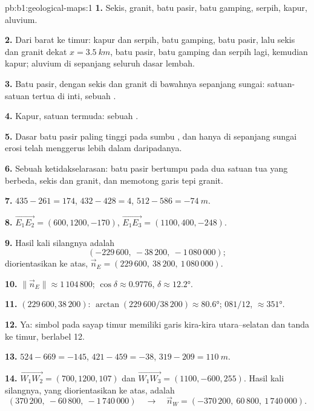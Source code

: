 \begin{solution}{pb:b1:geological-maps:1}
\textbf{1.} Sekis, granit, batu pasir, batu gamping, serpih, kapur, aluvium.

\textbf{2.} Dari barat ke timur: kapur dan serpih, batu gamping, batu pasir, lalu
sekis dan granit dekat $x = \qty{3.5}{km}$, batu pasir, batu gamping dan serpih
lagi, kemudian kapur; aluvium di sepanjang seluruh dasar lembah.

\textbf{3.} Batu pasir, dengan sekis dan granit di bawahnya sepanjang sungai: satuan-satuan tertua di inti, sebuah .

\textbf{4.} Kapur, satuan termuda: sebuah .

\textbf{5.} Dasar batu pasir paling tinggi pada sumbu , dan hanya di sepanjang sungai erosi telah menggerus lebih dalam daripadanya.

\textbf{6.} Sebuah ketidakselarasan: batu pasir bertumpu pada dua satuan tua yang berbeda, sekis dan granit, dan memotong garis tepi granit.

\textbf{7.} $435 - 261 = 174$, $432 - 428 = 4$, $512 - 586 = \qty{-74}{m}$.

\textbf{8.} $\overrightarrow{E_1E_2} = (600, 1200, -170)$,
$\overrightarrow{E_1E_3} = (1100, 400, -248)$.

\textbf{9.} Hasil kali silangnya adalah
\[
  (-229\,600,\ -38\,200,\ -1\,080\,000);
\]
diorientasikan ke atas, $\vec n_E = (229\,600,\ 38\,200,\ 1\,080\,000)$.

\textbf{10.} $\|\vec n_E\| \approx 1\,104\,800$; $\cos\delta \approx 0.9776$,
$\delta \approx \ang{12.2}$.

\textbf{11.}  $(229\,600, 38\,200)$: $\arctan(229\,600/38\,200)
\approx \ang{80.6}$;  $081/12$,  $\approx \ang{351}$.

\textbf{12.} Ya: simbol pada sayap timur memiliki garis  kira-kira utara--selatan dan tanda  ke timur, berlabel 12.

\textbf{13.} $524 - 669 = -145$, $421 - 459 = -38$, $319 - 209 =
\qty{110}{m}$.

\textbf{14.} $\overrightarrow{W_1W_2} = (700, 1200, 107)$ dan
$\overrightarrow{W_1W_3} = (1100, -600, 255)$. Hasil kali silangnya, yang diorientasikan ke atas, adalah
\[
  (370\,200,\ -60\,800,\ -1\,740\,000) \quad\longrightarrow\quad
  \vec n_W = (-370\,200,\ 60\,800,\ 1\,740\,000).
\]


\end{solution}

